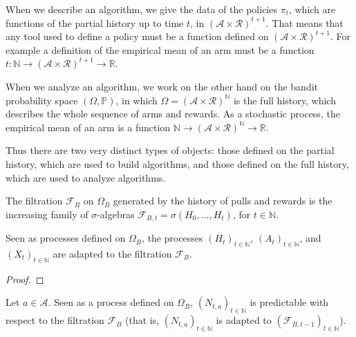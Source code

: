 \begin{remark}
When we describe an algorithm, we give the data of the policies $\pi_t$, which are functions of the partial history up to time $t$, in $(\mathcal{A} \times \mathcal{R})^{t+1}$.
That means that any tool used to define a policy must be a function defined on $(\mathcal{A} \times \mathcal{R})^{t+1}$.
For example a definition of the empirical mean of an arm must be a function $t : \mathbb{N} \to (\mathcal{A} \times \mathcal{R})^{t+1} \to \mathbb{R}$.

When we analyze an algorithm, we work on the other hand on the bandit probability space $(\Omega, \mathbb{P})$, in which $\Omega = (\mathcal{A} \times \mathcal{R})^{\mathbb{N}}$ is the full history, which describes the whole sequence of arms and rewards.
As a stochastic process, the empirical mean of an arm is a function $\mathbb{N} \to (\mathcal{A} \times \mathcal{R})^{\mathbb{N}} \to \mathbb{R}$.

Thus there are two very distinct types of objects: those defined on the partial history, which are used to build algorithms, and those defined on the full history, which are used to analyze algorithms.
\end{remark}


\begin{definition}[Filtration]\label{def:banditFiltration}
  \leanok
The filtration $\mathcal{F}_B$ on $\Omega_B$ generated by the history of pulls and rewards is the increasing family of $\sigma$-algebras
$\mathcal{F}_{B,t} = \sigma(H_0, \ldots, H_t)$, for $t \in \mathbb{N}$.
\end{definition}


\begin{lemma}\label{lem:adapted_hist}
Seen as processes defined on $\Omega_B$, the processes $(H_t)_{t \in \mathbb{N}}$, $(A_t)_{t \in \mathbb{N}}$, and $(X_t)_{t \in \mathbb{N}}$ are adapted to the filtration $\mathcal{F}_B$.
\end{lemma}

\begin{proof}

\end{proof}


\begin{lemma}\label{lem:predictable_pullCount}
Let $a \in \mathcal{A}$. Seen as a process defined on $\Omega_B$, $(N_{t,a})_{t \in \mathbb{N}}$ is predictable with respect to the filtration $\mathcal{F}_B$ (that is, $(N_{t,a})_{t \in \mathbb{N}}$ is adapted to $(\mathcal{F}_{B, t-1})_{t \in \mathbb{N}}$).
\end{lemma}

